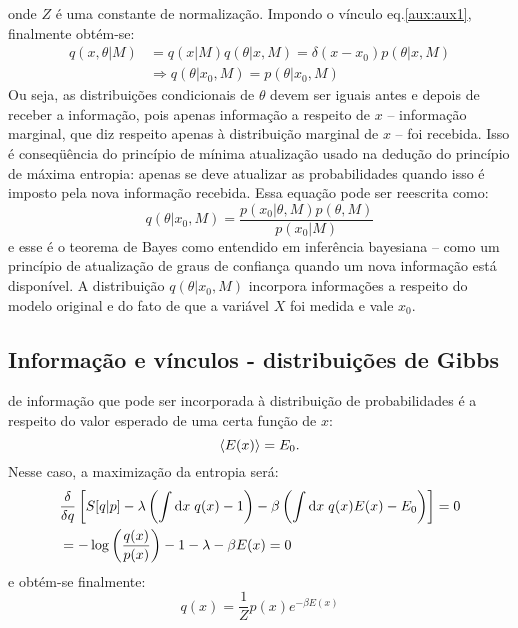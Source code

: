 onde $Z$ é uma constante de normalização. Impondo o vínculo eq.\eqref{aux:aux1}, finalmente obtém-se:
\begin{align*}
 q(x,\theta|M) &= q(x|M)q(\theta|x, M) =  \delta(x-x_0) p(\theta|x, M) \\ &\Rightarrow q(\theta|x_0, M) = p(\theta|x_0, M)
\end{align*}
Ou seja, as distribuições condicionais de $\theta$ devem ser iguais antes e depois de receber a informação, pois apenas informação a respeito de $x$ -- informação marginal, que diz respeito apenas à distribuição marginal de $x$ -- foi recebida. Isso é conseqüência do princípio de mínima atualização usado na dedução do princípio de máxima entropia: apenas se deve atualizar as probabilidades quando isso é imposto pela nova informação recebida. Essa equação pode ser reescrita como:
\begin{equation}
 q(\theta | x_0, M) = \dfrac{p(x_0 | \theta, M)p(\theta, M)}{p(x_0 |M)}
\end{equation}
e esse é o teorema de Bayes como entendido em inferência bayesiana -- como um princípio de atualização de graus de confiança quando um nova informação está disponível. A distribuição $q(\theta | x_0, M)$ incorpora informações a respeito do modelo original e do fato de que a variável $X$ foi medida e vale $x_0$. 

\subsection{Informação e vínculos - distribuições de Gibbs}
 de informação que pode ser incorporada à distribuição de probabilidades é a respeito do valor esperado de uma certa função de $x$:
\[
 \left\langle E(x) \right\rangle = E_0.
\]
Nesse caso, a maximização da entropia será:
\begin{align*}
  &\frac{\delta}{\delta q} \left[S[q | p] - \lambda \left(\int \mathrm{d} x\; q(x) -1 \right) - \beta\left(\int\mathrm{d} x\; q(x) E(x) - E_0\right)\right] =0\\
  &= - \log\left(\frac{q(x)}{p(x)}\right) - 1 - \lambda -\beta E(x) = 0
\end{align*}
e obtém-se finalmente:
\begin{equation}
\label{eq:gibbs}
 q(x) = \dfrac{1}{Z}p(x) e^{-\beta E(x)}
\end{equation}


